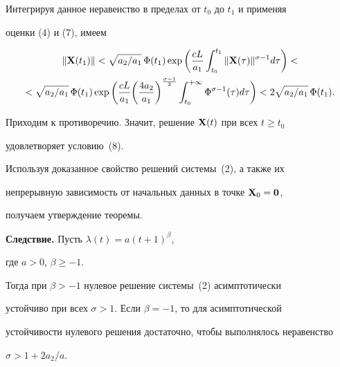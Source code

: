 \begin{pf}
Интегрируя данное неравенство в пределах от $t_0$ до $t_1$ и применяя


оценки (4) и (7), имеем


\begin{multline*}


\|\bold X(t_1)\| < \sqrt{a_2/a_1} \, \Phi(t_1) \exp \bigg(


\frac{c L}{a_1} \int_{t_0}^{t_1} \|\bold X(\tau)\|^


{\sigma-1} d\tau \bigg) < \\


%


< \sqrt{a_2/a_1} \, \Phi(t_1) 


\exp \bigg(\frac{cL}{a_1}


\bigg(\frac{4 a_2}{a_1}\bigg)^{\frac{\sigma-1}2}


\int_{t_0}^{+\infty} \Phi^{\sigma-1}


(\tau)  d\tau \bigg) < 2 \sqrt{a_2/a_1} \, \Phi(t_1).


\end{multline*}


Приходим к противоречию. Значит, решение $\bold X(t)$ при всех $t\geq t_0$


удовлетворяет условию~(8).





Используя доказанное свойство решений системы~(2), а также их


непрерывную зависимость от начальных данных в точке $\bold X_0=\bold 0$,


получаем утверждение теоремы.


\end{pf}





{\bf Следствие.} Пусть $\lambda(t)=a(t+1)^\beta$,


где $a>0$, $\beta\geq -1$.


Тогда при $\beta>-1$ нулевое решение системы~(2) асимптотически


устойчиво при всех $\sigma>1$. Если $\beta=-1$, то для асимптотической


устойчивости нулевого решения достаточно, чтобы выполнялось неравенство


$\sigma>1+2a_2/a$.





